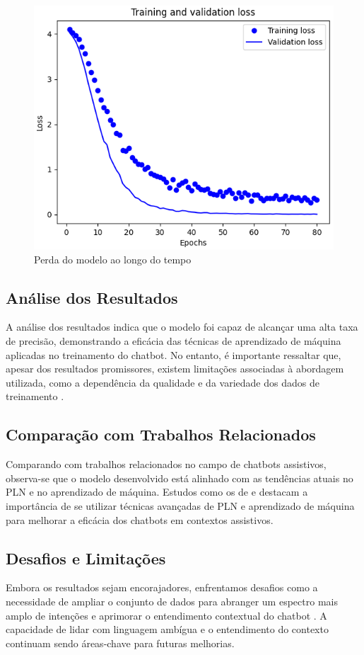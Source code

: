 \documentclass[conference]{IEEEtran}
\begin{document}
\begin{figure}[htbp]
    \centerline{\includegraphics[scale=0.5]{loss.png}}
    \caption{Perda do modelo ao longo do tempo}
    \label{fig4}
\end{figure}

\subsection{Análise dos Resultados}
A análise dos resultados indica que o modelo foi capaz de alcançar uma alta taxa de precisão, demonstrando a eficácia das técnicas de 
aprendizado de máquina aplicadas no treinamento do chatbot. 
No entanto, é importante ressaltar que, apesar dos resultados promissores, existem limitações associadas à abordagem utilizada, 
como a dependência da qualidade e da variedade dos dados de treinamento \cite{Hastie2009}.

\subsection{Comparação com Trabalhos Relacionados}
Comparando com trabalhos relacionados no campo de chatbots assistivos, observa-se que o modelo desenvolvido está alinhado 
com as tendências atuais no PLN e no aprendizado de máquina. 
Estudos como os de \cite{Laranjo2018} e \cite{McTear2016} destacam a importância de se utilizar técnicas avançadas de PLN 
e aprendizado de máquina para melhorar a eficácia dos chatbots em contextos assistivos.

\subsection{Desafios e Limitações}
Embora os resultados sejam encorajadores, enfrentamos desafios como a necessidade de ampliar o conjunto de dados 
para abranger um espectro mais amplo de intenções e aprimorar o entendimento contextual do chatbot \cite{Young2018}. 
A capacidade de lidar com linguagem ambígua e o entendimento do contexto continuam sendo áreas-chave para futuras melhorias.
\end{document}
